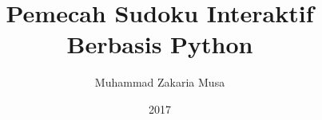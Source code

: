\documentclass[a4paper,12pt,oneside]{book}
\title{Pemecah Sudoku Interaktif Berbasis Python}\let\Title\@title   %
\author{Muhammad Zakaria Musa}  \let\Author\@author  %
\date{2017}           \let\Date\@date %
\newif\iflogTA
\begin{document}
\begin{titlepage}
\thispagestyle{empty}

\pagebreak
\iflogTA

\pagebreak
\fi
\thispagestyle{empty}

\pagebreak
\end{titlepage}

\iflogTA
\pagebreak
\addcontentsline{toc}{chapter}{Abstract}

\pagebreak
\addcontentsline{toc}{chapter}{Lembar Persembahan}

\pagebreak
\addcontentsline{toc}{chapter}{Kata Pengantar}

\pagebreak
\fi
\cleardoublepage
{}
\tableofcontents
\iflogTA
\newpage
\cleardoublepage
\addcontentsline{toc}{chapter}{Daftar Gambar}
\listoffigures
\newpage
\cleardoublepage
\addcontentsline{toc}{chapter}{Daftar Tabel}
\listoftables
\fi
%
\cleardoublepage
{}

%

%

%
%
%
%
%
\cleardoublepage
{}

%
\cleardoublepage
{}

\end{document}
